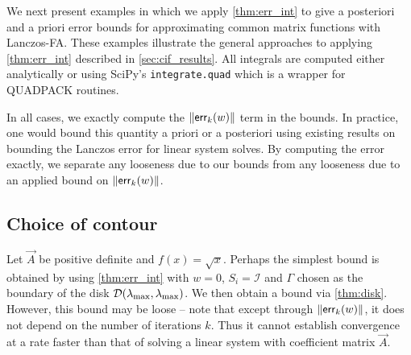 We next present examples in which we apply  \cref{thm:err_int} to give a posteriori and a priori error bounds for approximating common matrix functions with Lanczos-FA. These examples illustrate the general approaches to applying \cref{thm:err_int} described in \cref{sec:cif_results}. 
All integrals are computed either analytically or using SciPy's \texttt{integrate.quad} which is a wrapper for QUADPACK routines. 

In all cases, we exactly compute the $\| \textup{\textsf{err}}_k(w) \|$ term in the bounds. 
In practice, one would bound this quantity a priori or a posteriori using existing results on bounding the Lanczos error for linear system solves.
By computing the error exactly, we separate any looseness due to our bounds from any looseness due to an applied bound on  $\| \textup{\textsf{err}}_k(w) \|$. 



\subsection{Choice of contour}
\label{ex:sqrt_contours}
Let \( \vec{A} \) be positive definite and  \( f(x) = \sqrt{x} \).
Perhaps the simplest bound is obtained by using \cref{thm:err_int} with $w = 0$, \( S_i = \mathcal{I} \) and \( \Gamma \) chosen as the boundary of the disk \( \mathcal{D}(\lambda_{\textup{max}}, \lambda_{\textup{max}} ) \).%
We then obtain a bound via \cref{thm:disk}. 
However, this bound may be loose -- note that except through $\|\textup{\textsf{err}}_k(w)\|$, it does not depend on the number of iterations $k$.  Thus it cannot establish convergence at a rate faster than that of solving a linear system with coefficient matrix \( \vec{A} \).


